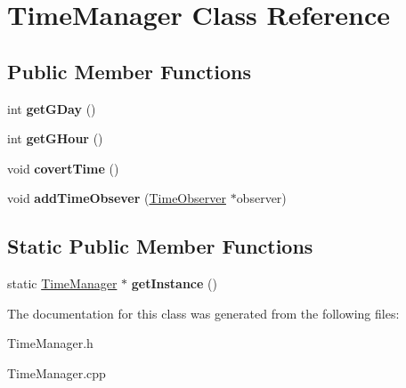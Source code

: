 \hypertarget{class_time_manager}{}\section{Time\+Manager Class Reference}
\label{class_time_manager}
\subsection*{Public Member Functions}
\begin{DoxyCompactItemize}
\item 
\mbox{\label{class_time_manager_a0ac1e15f52e5eea41a2d18674cf72715}} 
int {\bfseries get\+G\+Day} ()
\item 
\mbox{\label{class_time_manager_a379a4916e515c90e3370a1da629cde8c}} 
int {\bfseries get\+G\+Hour} ()
\item 
\mbox{\label{class_time_manager_a50b4408595800df3d8849768fa04b1ab}} 
void {\bfseries covert\+Time} ()
\item 
\mbox{\label{class_time_manager_a6f58612f76771bba8b5bd31add3515f4}} 
void {\bfseries add\+Time\+Obsever} (\hyperlink{class_time_observer}{Time\+Observer} $\ast$observer)
\end{DoxyCompactItemize}
\subsection*{Static Public Member Functions}
\begin{DoxyCompactItemize}
\item 
\mbox{\label{class_time_manager_a5f583a47c375aca352161eaedd24a326}} 
static \hyperlink{class_time_manager}{Time\+Manager} $\ast$ {\bfseries get\+Instance} ()
\end{DoxyCompactItemize}


The documentation for this class was generated from the following files\+:\begin{DoxyCompactItemize}
\item 
Time\+Manager.\+h\item 
Time\+Manager.\+cpp\end{DoxyCompactItemize}

